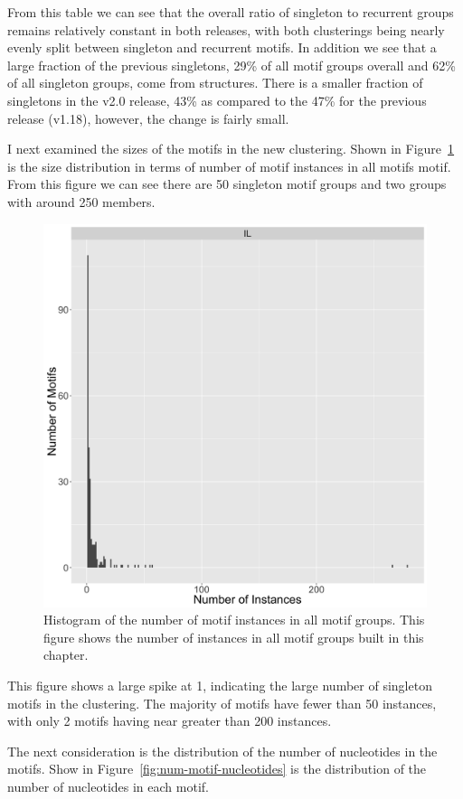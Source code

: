 From this table we can see that the overall ratio of singleton to recurrent
groups remains relatively constant in both releases, with both clusterings being
nearly evenly split between singleton and recurrent motifs. In addition we see
that a large fraction of the previous singletons, 29\% of all motif groups
overall and 62\% of all singleton groups, come from \cyem{} structures. There is
a smaller fraction of singletons in the v2.0 release, 43\% as compared to the
47\% for the previous release (v1.18), however, the change is fairly small.

I next examined the sizes of the motifs in the new clustering. Shown in
Figure~\ref{fig:num-motif-instances} is the size distribution in terms of number
of motif instances in all motifs motif. From this figure we can see there are 50
singleton motif groups and two groups with around 250 members.

\begin{figure}
  \includegraphics[width=0.5\linewidth]{chapter-5/figs/motifs/instances}
  \caption{Histogram of the number of motif instances in all motif groups. This
  figure shows the number of instances in all motif groups built in this chapter.}
  \label{fig:num-motif-instances}
\end{figure}

This figure shows a large spike at 1, indicating the large number of singleton
motifs in the clustering. The majority of motifs have fewer than 50 instances,
with only 2 motifs having near greater than 200 instances.

The next consideration is the distribution of the number of nucleotides in the
motifs. Show in Figure~\ref{fig:num-motif-nucleotides} is the distribution of
the number of nucleotides in each motif.

